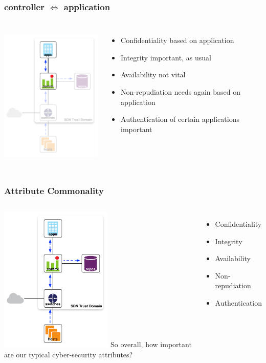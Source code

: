 \documentclass[t,handout]{beamer}
\begin{document}
\begin{frame}
\frametitle{controller $\Longleftrightarrow$  application}
\begin{columns}[T]
\includegraphics[height=2.75in]{ra-c-a}
\begin{itemize}
\item {\color{orange} Confidentiality based on application}
\item {\color{red} Integrity important, as usual}
\item {\color{green} Availability not vital} 
\item {\color{green} Non-repudiation needs again based on application}
\item {\color{red} Authentication of certain applications important}
\end{itemize}
\end{columns}
\end{frame}

\begin{frame}
\frametitle{Attribute Commonality}
\begin{columns}[T]
\includegraphics[height=2.75in]{reference-model}
So overall, how important are our typical cyber-security attributes?
\\~\\
\begin{itemize}
\item {\color{green} Confidentiality}
\item {\color{red} Integrity}
\item {\color{orange} Availability}
\item {\color{green} Non-repudiation}
\item {\color{red} Authentication}
\end{itemize}
\end{columns}
\end{frame}
\end{document}
